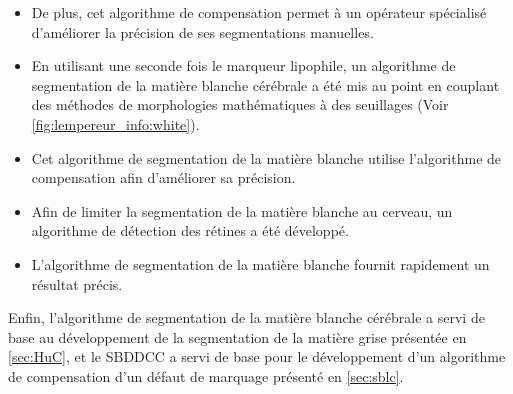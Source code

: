 \documentclass[\main/main.tex]{subfiles}
\begin{document}
\begin{itemize}
    \item
    De plus, cet algorithme de compensation permet à un opérateur spécialisé
    d'améliorer la précision de ses segmentations manuelles.
    
    \item
    En utilisant une seconde fois le marqueur lipophile, un algorithme de segmentation de la matière blanche cérébrale a été mis au point en couplant des méthodes de morphologies mathématiques à des seuillages (Voir \autoref{fig:lempereur_info:white}).
    
    \item
    Cet algorithme de segmentation de la matière blanche utilise
    l'algorithme de compensation afin d'améliorer sa précision.
    
    \item
    Afin de limiter la segmentation de la matière blanche au cerveau,
    un algorithme de détection des rétines a été développé.
    
    \item
    L'algorithme de segmentation de la matière blanche fournit rapidement un résultat précis. 
    
\end{itemize}

%
Enfin, l'algorithme de segmentation de la matière blanche cérébrale a servi de base au
développement de la segmentation de la matière grise présentée en \autoref{sec:HuC},
et le SBDDCC a servi de base pour le développement d'un algorithme de compensation
d'un défaut de marquage \ihc{} présenté en \autoref{sec:sblc}.
\end{document}
